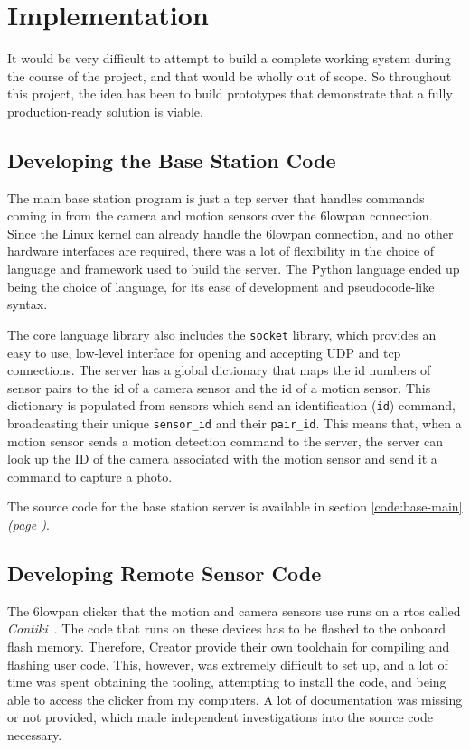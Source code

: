 \chapter{Implementation}

It would be very difficult to attempt to build a complete working system
during the course of the project, and that would be wholly out of scope. So
throughout this project, the idea has been to build prototypes that
demonstrate that a fully production-ready solution is viable.


\section{Developing the Base Station Code}
The main base station program is just a \acrshort{tcp} server that handles
commands coming in from the camera and motion sensors over the \gls{6lowpan}
connection. Since the Linux kernel can already handle the \gls{6lowpan}
connection, and no other hardware interfaces are required, there was a lot of
flexibility in the choice of language and framework used to build the server.
The Python language ended up being the choice of language, for its ease of
development and pseudocode-like syntax.

The core language library also includes the \texttt{socket} library, which
provides an easy to use, low-level interface for opening and accepting UDP
and \acrshort{tcp} connections. The server has a global dictionary that maps
the id numbers of sensor pairs to the id of a camera sensor and the id of a
motion sensor. This dictionary is populated from sensors which send an
identification (\texttt{id}) command, broadcasting their unique
\texttt{sensor\_id} and their \texttt{pair\_id}. This means that, when a
motion sensor sends a motion detection command to the server, the server can
look up the ID of the camera associated with the motion sensor and send it a
command to capture a photo.

The source code for the base station server is available in section
\ref{code:base-main} \textit{(page \pageref{code:base-main})}.

\section{Developing Remote Sensor Code}
The \gls{6lowpan} clicker that the motion and camera sensors use runs on a
\acrfull{rtos} called \textit{Contiki}~\cite{contiki}. The code that runs on
these devices has to be flashed to the onboard flash memory. Therefore,
Creator provide their own toolchain for compiling and flashing user code.
This, however, was extremely difficult to set up, and a lot of time was spent
obtaining the tooling, attempting to install the code, and being able to
access the clicker from my computers. A lot of documentation was missing or
not provided, which made independent investigations into the source code
necessary.

